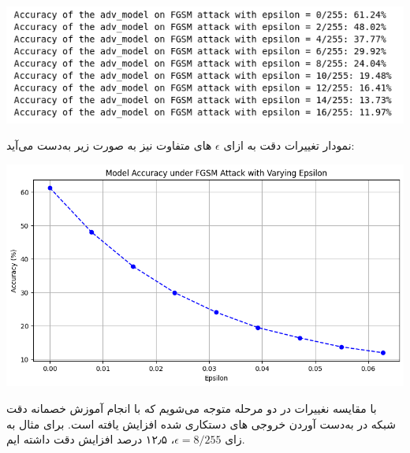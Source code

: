 \begin{qsolve}
	\begin{center}
		\includegraphics*[width=0.7\linewidth]{pics/img14.png}
		\label{تست نمونه ها با شبکه آموزش داده شده جدید به ازای epsilon های متفاوت}
	\end{center}
	
	نمودار تغییرات دقت به ازای $\epsilon$ های متفاوت نیز به صورت زیر به‌دست می‌آید:
	
	\begin{center}
		\includegraphics*[width=0.7\linewidth]{pics/img15.png}
		\label{نمودار تغییرات دقت شبکه به ازای epsilon های متفاوت}
	\end{center}
	
	
	با مقایسه نغییرات در دو مرحله متوجه می‌شویم که با انجام آموزش خصمانه دقت شبکه در به‌دست آوردن خروجی های دستکاری شده افزایش یافته است. برای مثال به زای $\epsilon=8/255$، 
	۱۲٫۵ درصد افزایش دقت داشته ایم.
	
	
\end{qsolve}